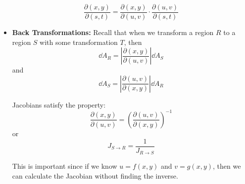 \begin{itemize}
    \begin{equation}
        \frac{\partial(x,y)}{\partial(s,t)} = \frac{\partial(x,y)}{\partial(u,v)}\cdot \frac{\partial (u,v)}{\partial (s,t)}
    \end{equation}
    \item \textbf{Back Transformations:} Recall that when we transform a region $R$ to a region $S$ with some transformation $T$, then 
    \begin{equation}
        \dd{A}_R = \left|\frac{\partial (x,y)}{\partial (u,v)}\right|\dd{A}_S
    \end{equation}
    and 
    \begin{equation}
        \dd{A}_S = \left|\frac{\partial (u,v)}{\partial (x,y)}\right|\dd{A}_R
    \end{equation}
    \begin{theorem}
        Jacobians satisfy the property: 
        \begin{equation}
            \frac{\partial(x,y)}{\partial(u,v)} = \left(\frac{\partial(u,v)}{\partial (x,y)}\right)^{-1}
        \end{equation}
        or 
        \begin{equation}
            J_{S\rightarrow R} = \frac{1}{J_{R\rightarrow S}}
        \end{equation}
    \end{theorem}
    \begin{idea}
        This is important since if we know $u=f(x,y)$ and $v=g(x,y)$, then we can calculate the Jacobian without finding the inverse. 
    \end{idea}
\end{itemize}